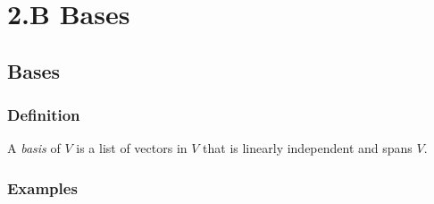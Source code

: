 \documentclass[11pt]{article}
\begin{document}
    \pagebreak


    \section{2.B Bases}

    \subsection{Bases}

    \subsubsection{Definition}

    A \emph{basis} of $V$ is a list of vectors in $V$ that is linearly independent and spans $V$.

    \subsubsection{Examples}
\end{document}
